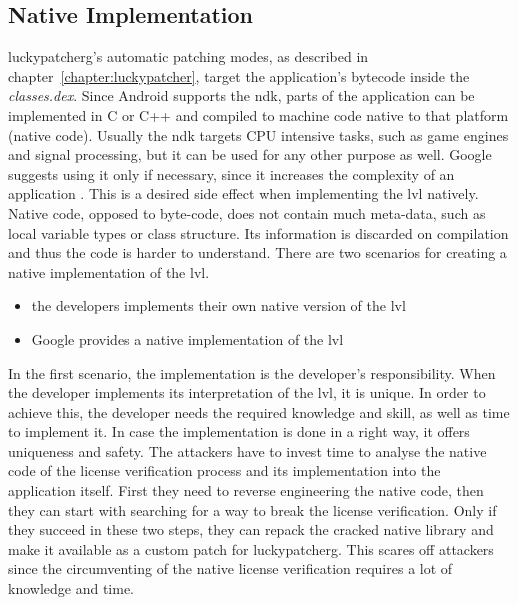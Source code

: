 \subsection{Native Implementation} \label{subsection:counter-modifications-dynamic}
\gls{luckypatcherg}'s automatic patching modes, as described in chapter~\ref{chapter:luckypatcher}, target the application's bytecode inside the \textit{classes.dex}.
Since Android supports the \gls{ndk}, parts of the application can be implemented in C or C++ and compiled to machine code native to that platform (native code).
\newline
Usually the \gls{ndk} targets CPU intensive tasks, such as game engines and signal processing, but it can be used for any other purpose as well.
Google suggests using it only if necessary, since it increases the complexity of an application \cite{androidNdk}.
This is a desired side effect when implementing the \gls{lvl} natively.
Native code, opposed to byte-code, does not contain much meta-data, such as local variable types or class structure.
Its information is discarded on compilation and thus the code is harder to understand.
\newline
There are two scenarios for creating a native implementation of the \gls{lvl}.
\begin{itemize}
  \item the developers implements their own native version of the \gls{lvl}
  \item Google provides a native implementation of the \gls{lvl}
\end{itemize}
In the first scenario, the implementation is the developer's responsibility.
When the developer implements its interpretation of the \gls{lvl}, it is unique.
In order to achieve this, the developer needs the required knowledge and skill, as well as time to implement it.
In case the implementation is done in a right way, it offers uniqueness and safety.
The attackers have to invest time to analyse the native code of the license verification process and its implementation into the application itself.
First they need to reverse engineering the native code, then they can start with searching for a way to break the license verification.
Only if they succeed in these two steps, they can repack the cracked native library and make it available as a custom patch for \gls{luckypatcherg}.
This scares off attackers since the circumventing of the native license verification requires a lot of knowledge and time. \cite{munteanLicense}
\newline
